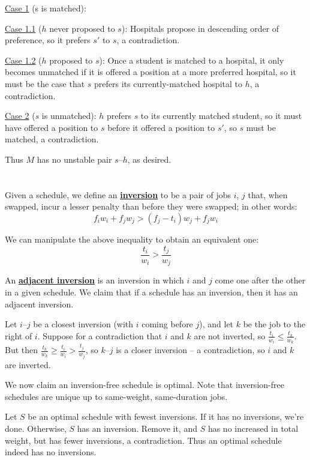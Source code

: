 \documentclass[11pt]{article}
\begin{document}
\noindent
\underline{Case 1} (s is matched):
\newline

\indent
\underline{Case 1.1} ($h$ never proposed to $s$): Hospitals propose in descending order of preference, so it prefers $s'$ to $s$, a contradiction.
\newline

\indent
\underline{Case 1.2} ($h$ proposed to $s$): Once a student is matched to a hospital, it only becomes unmatched if it is offered a position at a more preferred hospital, so it must be the case that $s$ prefers its currently-matched hospital to $h$, a contradiction.
\newline

\underline{Case 2} ($s$ is unmatched): $h$ prefers $s$ to its currently matched student, so it must have offered a position to $s$ before it offered a position to $s'$, so $s$ must be matched, a contradiction.

Thus $M$ has no unstable pair $s$--$h$, as desired.


\section{} %
Given a schedule, we define an \textbf{\underline{inversion}} to be a pair of jobs $i$, $j$ that, when swapped, incur a lesser penalty than before they were swapped; in other words:
\[f_iw_i + f_jw_j > (f_j-t_i)w_j + f_jw_i\]

We can manipulate the above inequality to obtain an equivalent one:
\[\frac{t_i}{w_i} > \frac{t_j}{w_j}\]

An \textbf{\underline{adjacent inversion}} is an inversion in which $i$ and $j$ come one after the other in a given schedule.
We claim that if a schedule has an inversion, then it has an adjacent inversion.

Let $i$--$j$ be a closest inversion (with $i$ coming before $j$), and let $k$ be the job to the right of $i$.
Suppose for a contradiction that $i$ and $k$ are not inverted, so $\frac{t_i}{w_i} \le \frac{t_k}{w_k}$.
But then $\frac{t_k}{w_k} \ge \frac{t_i}{w_i} > \frac{t_j}{w_j}$, so $k$--$j$ is a closer inversion -- a contradiction, so $i$ and $k$ are inverted.

We now claim an inversion-free schedule is optimal. Note that inversion-free schedules are unique up to same-weight, same-duration jobs.

Let $S$ be an optimal schedule with fewest inversions.
If it has no inversions, we're done.
Otherwise, $S$ has an inversion.
Remove it, and $S$ has no increased in total weight, but has fewer inversions, a contradiction.
Thus an optimal schedule indeed has no inversions.
\end{document}
